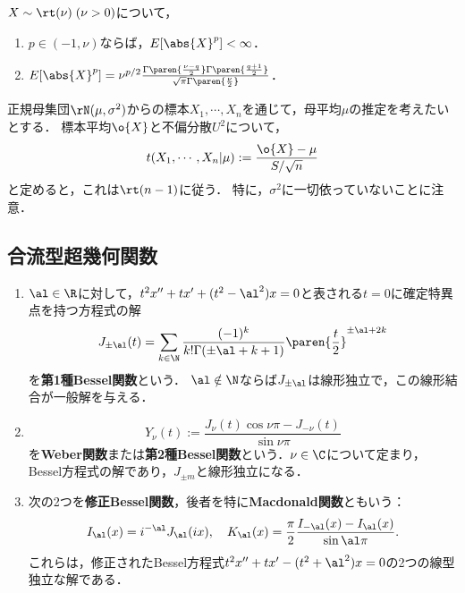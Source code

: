 \documentclass[uplatex,dvipdfmx]{jsreport}
\begin{document}
\begin{proposition}[積率の存在]
    $X\sim\rt(\nu)\;(\nu>0)$について，
    \begin{enumerate}
        \item $p\in(-1,\nu)$ならば，$E[\abs{X}^p]<\infty$．
        \item $E[\abs{X}^p]=\nu^{p/2}\frac{\Gamma\paren{\frac{\nu-q}{2}}\Gamma\paren{\frac{q+1}{2}}}{\sqrt{\pi}\Gamma\paren{\frac{\nu}{2}}}$．
    \end{enumerate}
\end{proposition}

\begin{application}
    正規母集団$\rN(\mu,\sigma^2)$からの標本$X_1,\cdots,X_n$を通じて，母平均$\mu$の推定を考えたいとする．
    標本平均$\o{X}$と不偏分散$U^2$について，
    \[t(X_1,\cdots,X_n|\mu):=\frac{\o{X}-\mu}{S/\sqrt{n}}\]
    と定めると，これは$\rt(n-1)$に従う．
    特に，$\sigma^2$に一切依っていないことに注意．

\end{application}

\subsection{合流型超幾何関数}

\begin{definition}\mbox{}
    \begin{enumerate}
        \item $\al\in\R$に対して，$t^2x''+tx'+(t^2-\al^2)x=0$と表される$t=0$に確定特異点を持つ方程式の解
        \[J_{\pm\al}(t)=\sum_{k\in\N}\frac{(-1)^k}{k!\Gamma(\pm\al+k+1)}\paren{\frac{t}{2}}^{\pm\al+2k}\]
        を\textbf{第1種Bessel関数}という．
        $\al\notin\N$ならば$J_{\pm\al}$は線形独立で，この線形結合が一般解を与える．
        \item \[Y_\nu(t):=\frac{J_\nu(t)\cos\nu\pi-J_{-\nu}(t)}{\sin\nu\pi}\]
        を\textbf{Weber関数}または\textbf{第2種Bessel関数}という．$\nu\in\C$について定まり，Bessel方程式の解であり，$J_{\pm m}$と線形独立になる．
        \item 次の2つを\textbf{修正Bessel関数}，後者を特に\textbf{Macdonald関数}ともいう：
        \[I_\al(x)=i^{-\al}J_\al(ix),\quad K_\al(x)=\frac{\pi}{2}\frac{I_{-\al}(x)-I_\al(x)}{\sin\al\pi}.\]
        これらは，修正されたBessel方程式$t^2x''+tx'-(t^2+\al^2)x=0$の2つの線型独立な解である．
    \end{enumerate}
\end{definition}
\end{document}
